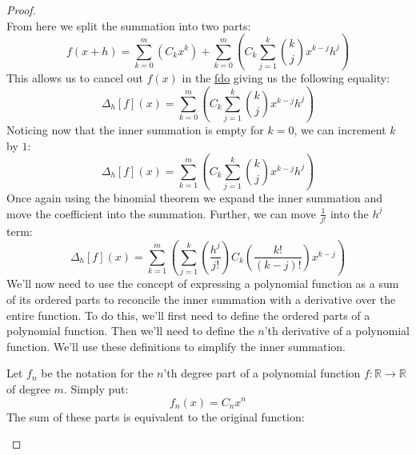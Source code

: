 \begin{proof}
\begin{equation}
  \end{equation}
  From here we split the summation into two parts:
  \begin{equation}
    \label{eq:fdo-simplification-4}
    f\left(x+h\right)=\sum_{k=0}^{m}\left(C_kx^k\right)+\sum_{k=0}^{m}\left(C_k\sum_{j=1}^{k}{k\choose{j}}x^{k-j}h^j\right)
  \end{equation}
  This allows us to cancel out $f\left(x\right)$ in the \hyperref[eq:fdo-simplification]{\ac{fdo}} giving us the following equality:
  \begin{equation}
    \label{eq:fdo-simplification-5}
    \Delta_{h}\left[f\right]\left(x\right)=\sum_{k=0}^{m}\left(C_k\sum_{j=1}^{k}{k\choose{j}}x^{k-j}h^j\right)
  \end{equation}
  Noticing now that the inner summation is empty for $k=0$, we can increment $k$ by $1$:
  \begin{equation}
    \label{eq:fdo-simplification-6}
    \Delta_{h}\left[f\right]\left(x\right)=\sum_{k=1}^{m}\left(C_k\sum_{j=1}^{k}{k\choose{j}}x^{k-j}h^j\right)
  \end{equation}
  Once again using the binomial theorem we expand the inner summation and move the coefficient into the summation. Further, we can move $\frac{1}{j!}$ into the $h^j$ term:
  \begin{equation}
    \label{eq:fdo-simplification-7}
    \Delta_{h}\left[f\right]\left(x\right)=\sum_{k=1}^{m}\left(\sum_{j=1}^{k}\left(\frac{h^j}{j!}\right)C_k\left(\frac{k!}{\left(k-j\right)!}\right)x^{k-j}\right)
  \end{equation}
  We'll now need to use the concept of expressing a polynomial function as a sum of its ordered parts to reconcile the inner summation with a derivative over the entire function. To do this, we'll first need to define the ordered parts of a polynomial function. Then we'll need to define the $n$'th derivative of a polynomial function. We'll use these definitions to simplify the inner summation.\par\bigskip
  \begin{definition}
    \label{def:ordered-part-definition}
    Let $f_n$ be the notation for the $n$'th degree part of a polynomial function $f:\mathbb{R}\to\mathbb{R}$ of degree $m$. Simply put:
    \begin{equation}
      \label{eq:ordered-part-definition}
      f_n\left(x\right)=C_nx^n
    \end{equation}
    The sum of these parts is equivalent to the original function:
    \begin{equation}

\end{equation}
\end{definition}
\end{proof}
